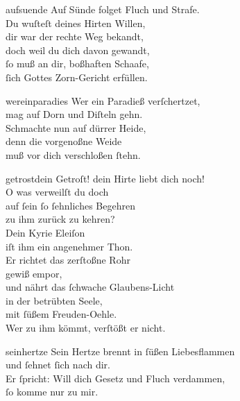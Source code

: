 \documentclass[tocstyle=ref-genre]{ees}
\begin{document}
{\clearpage
\begin{movement}{aufsuende}
  Auf Sünde folget Fluch und Strafe.\\
  Du wuſteſt deines Hirten Willen,\\
  dir war der rechte Weg bekandt,\\
  doch weil du dich davon gewandt,\\
  ſo muß an dir, boßhaften Schaafe,\\
  ſich Gottes Zorn-Gericht erfüllen.
\end{movement}

\begin{movement}{wereinparadies}
  Wer ein Paradieß verſchertzet,\\
  mag auf Dorn und Diſteln gehn.\\
  Schmachte nun auf dürrer Heide,\\
  denn die vorgenoßne Weide\\
  muß vor dich verschloßen ſtehn.
\end{movement}

\begin{movement}{getrostdein}
  Getroſt! dein Hirte liebt dich noch!\\
  O was verweilſt du doch\\
  auf ſein ſo ſehnliches Begehren\\
  zu ihm zurück zu kehren?\\
  Dein Kyrie Eleiſon\\
  iſt ihm ein angenehmer Thon.\\
  Er richtet das zerſtoßne Rohr\\
  gewiß empor,\\
  und nährt das ſchwache Glaubens-Licht\\
  in der betrübten Seele,\\
  mit ſüßem Freuden-Oehle.\\
  Wer zu ihm kömmt, verſtößt er nicht.
\end{movement}

\begin{movement}{seinhertze}
  Sein Hertze brennt in ſüßen Liebesflammen\\
  und ſehnet ſich nach dir.\\
  Er ſpricht: Will dich Gesetz und Fluch verdammen,\\
  ſo komme nur zu mir.
\end{movement}

}
\end{document}
